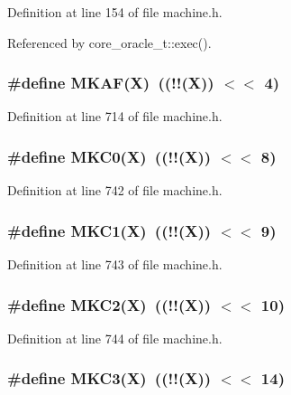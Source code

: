 Definition at line 154 of file machine.h.

Referenced by core\_\-oracle\_\-t::exec().
\subsubsection[{MKAF}]{\setlength{\rightskip}{0pt plus 5cm}\#define MKAF(X)~((!!(X)) $<$$<$ 4)}\label{machine_8h_bbe2c28e2115f2ec6f4679902aa1f7ea}




Definition at line 714 of file machine.h.
\subsubsection[{MKC0}]{\setlength{\rightskip}{0pt plus 5cm}\#define MKC0(X)~((!!(X)) $<$$<$ 8)}\label{machine_8h_46abd8240bd1311697d55cb819c039ec}




Definition at line 742 of file machine.h.
\subsubsection[{MKC1}]{\setlength{\rightskip}{0pt plus 5cm}\#define MKC1(X)~((!!(X)) $<$$<$ 9)}\label{machine_8h_c7832ec438b09e3625b03ef443cfafab}




Definition at line 743 of file machine.h.
\subsubsection[{MKC2}]{\setlength{\rightskip}{0pt plus 5cm}\#define MKC2(X)~((!!(X)) $<$$<$ 10)}\label{machine_8h_14d6753017d4d786250af2e86131c78e}




Definition at line 744 of file machine.h.
\subsubsection[{MKC3}]{\setlength{\rightskip}{0pt plus 5cm}\#define MKC3(X)~((!!(X)) $<$$<$ 14)}\label{machine_8h_4b8091e9419c87f8469f2faea00aa56e}




